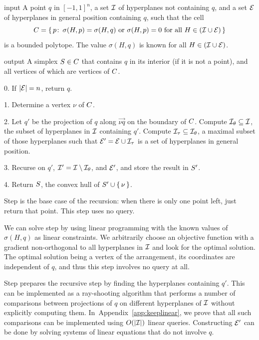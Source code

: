 \begin{algorithm}\label{algo:simplex}
\item[input] A point \(q\) in ${[-1,1]}^n$, a set $\mathcal{I}$ of hyperplanes not
	containing \(q\), and a set $\mathcal{E}$ of hyperplanes in general position
	containing \(q\), such that the cell
	$$
	C = \{\,p \colon\, \sigma(H,p) = \sigma(H,q)
			\ \text{or}\ \sigma(H,p) = 0
			\ \text{for all}\ H \in (\mathcal{I} \cup \mathcal{E})
		\,\}
	$$
	is a bounded polytope. The value \(\sigma(H,q)\) is known for
	all \(H \in (\mathcal{I} \cup \mathcal{E})\). %
\item[output] A simplex \(S \in C\) that contains \(q\) in
	its interior (if it is not a point), and all vertices
	of which are vertices of \(C\).
\item[0.] If $|{\mathcal{E}}|=n$, return $q$.
\item[1.] Determine a vertex \(\nu\) of $C$.
\item[2.] Let \(q'\) be the projection of \(q\) along \(\vec{\nu q}\) on the
	boundary of \(C\). Compute \(\mathcal{I}_\theta \subseteq \mathcal{I}\), the subset of
	hyperplanes in \(\mathcal{I}\) containing \(q'\). Compute \(\mathcal{I}_{\tau} \subseteq
	\mathcal{I}_{\theta}\), a maximal subset of those hyperplanes such that \(\mathcal{E}' = \mathcal{E}
	\cup \mathcal{I}_\tau\) is a set of hyperplanes in general position.
\item[3.] Recurse on \(q'\), \(\mathcal{I}' = \mathcal{I} \setminus \mathcal{I}_\theta\), and \(\mathcal{E}'\), and
	store the result in \(S'\).
\item[4.] Return $S$, the convex hull of \(S' \cup \left\{\,{\nu}\,\right\}\).
\end{algorithm}

Step  is the base case of the recursion: when there is only one point left, just return
that point. This step uses no query.

We can solve step  by using linear programming with the known values
of \(\sigma(H,q)\) as linear constraints. We arbitrarily choose an
objective function with a gradient non-orthogonal to all hyperplanes in
\(\mathcal{I}\) and look for the optimal solution. The optimal solution being a vertex of the arrangement,
its coordinates are independent of \(q\), and thus this step involves no query at all.

Step  prepares the recursive step by finding the hyperplanes containing
\(q'\). This can be implemented as a ray-shooting algorithm that performs
a number of comparisons between projections of $q$ on different hyperplanes of $\mathcal{I}$ without
explicitly computing them. In~Appendix~\ref{app:keeplinear}, we prove that all such comparisons
can be implemented using \(O(|{\mathcal{I}}|)\) linear queries.
Constructing \(\mathcal{E}'\) can be done by solving systems of linear
equations that do not involve \(q\).

